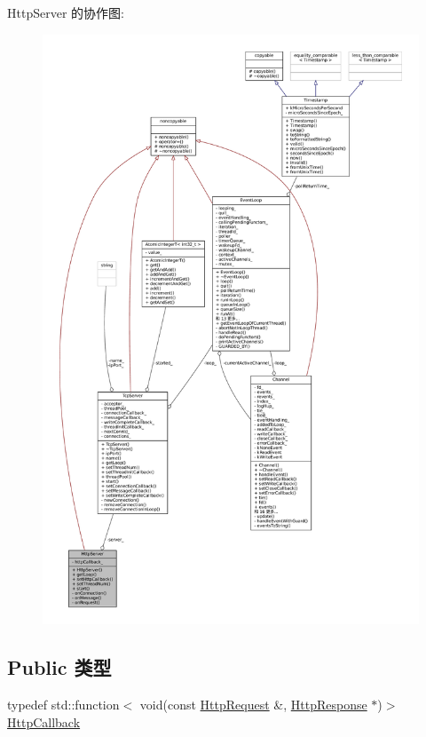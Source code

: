 Http\+Server 的协作图\+:
\nopagebreak
\begin{figure}[H]
\begin{center}
\leavevmode
\includegraphics[width=350pt]{classmuduo_1_1net_1_1HttpServer__coll__graph}
\end{center}
\end{figure}
\subsection*{Public 类型}
\begin{DoxyCompactItemize}
\item 
typedef std\+::function$<$ void(const \hyperlink{classmuduo_1_1net_1_1HttpRequest}{Http\+Request} \&, \hyperlink{classmuduo_1_1net_1_1HttpResponse}{Http\+Response} $\ast$)$>$ \hyperlink{classmuduo_1_1net_1_1HttpServer_ab343d6a3f751b7fb50940f92c64b6578}{Http\+Callback}
\end{DoxyCompactItemize}
